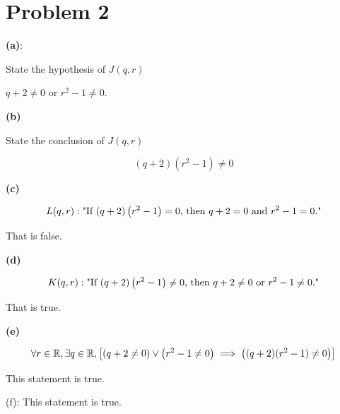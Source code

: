 \section{Problem 2}
\textbf{(a)}: 
\begin{problem}
    State the hypothesis of $J(q, r)$
\end{problem}
\begin{solution}
    $q + 2 \neq 0$ or $r^2 - 1 \neq 0$. 
\end{solution}

\newpage
\textbf{(b)}
\begin{problem}
    State the conclusion of $J(q, r)$
\end{problem}
\begin{solution}
    \begin{equation*}
        (q + 2)(r^2 - 1) \neq 0
    \end{equation*}
\end{solution}

\newpage
\textbf{(c)}
\begin{solution}
    \begin{equation*}
        L(q, r): \text{"If $\left(q + 2\right)\left(r^2 - 1\right) = 0$, then $q + 2 = 0$ and $r^2 - 1 = 0$."}
    \end{equation*}

    That is false. 
\end{solution}

\newpage
\textbf{(d)}
\begin{solution}
    \begin{equation*}
        K(q, r): \text{"If $\left(q + 2\right)\left(r^2 - 1\right) \neq 0$, then $q + 2 \neq 0$ or $r^2 - 1 \neq 0$."}
    \end{equation*}

    That is true.
\end{solution}
  
\newpage
\textbf{(e)}
\begin{solution}
    \begin{equation*}
        \forall r \in \mathbb{R}, \exists q \in \mathbb{R}, \left[(q + 2 \neq 0 ) \vee \left(r^2 - 1 \neq 0\right) \implies \left((q + 2)(r^2 - 1) \neq 0\right)\right]
    \end{equation*}

    This statement is true. 
\end{solution}

(f): This statement is true. 